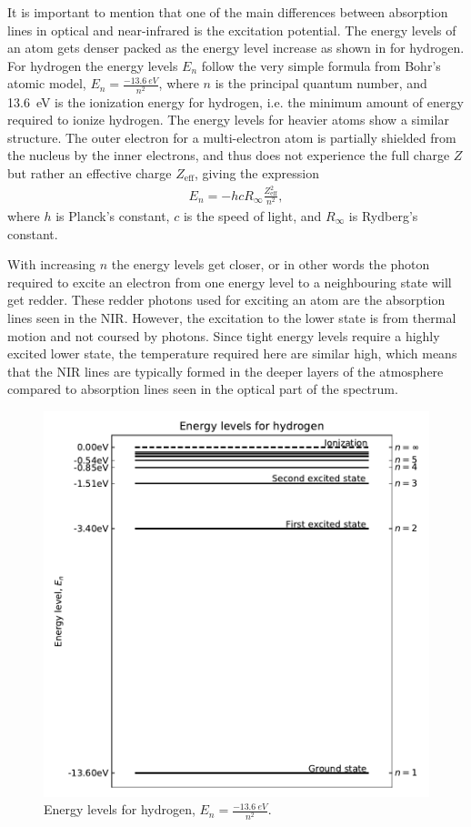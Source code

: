 It is important to mention that one of the main differences between absorption lines in optical and
near-infrared is the excitation potential. The energy levels of an atom gets denser packed as the
energy level increase as shown in  for hydrogen. For hydrogen the energy levels
$E_n$ follow the very simple formula from Bohr's atomic model, $E_n=\frac{\SI{-13.6}{eV}}{n^2}$,
where $n$ is the principal quantum number, and \SI{13.6}{eV} is the ionization energy for hydrogen,
i.e. the minimum amount of energy required to ionize hydrogen. The energy levels for heavier atoms
show a similar structure. The outer electron for a multi-electron atom is partially shielded from
the nucleus by the inner electrons, and thus does not experience the full charge $Z$ but rather an
effective charge $Z_\mathrm{eff}$, giving the expression
\begin{align}
  E_n = -hcR_\infty\frac{Z_\mathrm{eff}^2}{n^2},
\end{align}
where $h$ is Planck's constant, $c$ is the speed of light, and $R_\infty$ is Rydberg's constant.

With increasing $n$ the energy levels get closer, or in other words the photon required to excite an
electron from one energy level to a neighbouring state will get redder. These redder photons used
for exciting an atom are the absorption lines seen in the NIR. However, the excitation to the lower
state is from thermal motion and not coursed by photons. Since tight energy levels require a highly
excited lower state, the temperature required here are similar high, which means that the NIR lines
are typically formed in the deeper layers of the atmosphere compared to absorption lines seen in the
optical part of the spectrum.

\begin{figure}[htpb!]
    \centering
    \includegraphics[width=0.85\linewidth]{figures/energyLevels.pdf}
    \caption{Energy levels for hydrogen, $E_n=\frac{\SI{-13.6}{eV}}{n^2}$.}
    \label{fig:elevel}
\end{figure}

